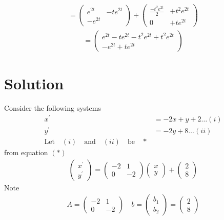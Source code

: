 \documentclass[a4paper, 12pt]{article}
\begin{document}
\begin{align*}
= 
\begin{pmatrix}
e^{2t} & -te^{2t} \\
-e^{2t}
\end{pmatrix} + 
\begin{pmatrix}
\frac{-t^2e^{2t}}{2} & + t^2e^{2t} \\
0 & + te^{2t}
\end{pmatrix}
\end{align*}
\begin{align*}
=
\begin{pmatrix}
e^{2t} -te^{2t} -t^2e^{2t} + t^2e^{2t} \\
-e^{2t} + te^{2t}
\end{pmatrix}
\end{align*}
\section{Solution}
Consider the following systems \\
\begin{align*}
x^\prime &= -2x + y + 2 \ldots (i)\\
y^\prime &= -2y + 8  \ldots (ii) \\
\text{Let} \quad (i) \quad \text{and} \quad (ii) \quad \text{be} \quad  *
\end{align*}
from equation $(*)$
\begin{align*}
\begin{pmatrix}
x^\prime \\
y^\prime 
\end{pmatrix} = 
\begin{pmatrix}
-2 & 1 \\
0 & -2
\end{pmatrix}
\begin{pmatrix}
x \\
y
\end{pmatrix} + 
\begin{pmatrix}
2 \\
8
\end{pmatrix}
\end{align*}
Note  
\begin{align*}
A = 
\begin{pmatrix}
-2 & 1 \\
0 & -2
\end{pmatrix} \quad b = 
\begin{pmatrix}
b_1 \\
b_2 
\end{pmatrix} = 
\begin{pmatrix}
2 \\
8
\end{pmatrix}
\end{align*}
\end{document}
